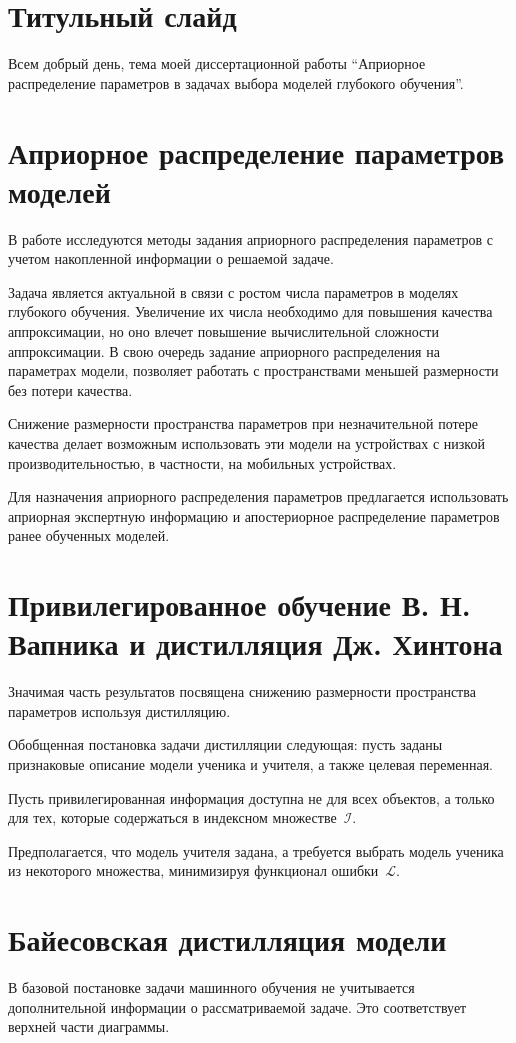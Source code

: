 \documentclass[10pt, twoside]{article}
\begin{document}
\section{Титульный слайд}
Всем добрый день, тема моей диссертационной работы ``Априорное распределение параметров в задачах выбора моделей глубокого обучения''.

\section{Априорное распределение параметров моделей}
В работе исследуются методы задания априорного распределения параметров с учетом накопленной информации о решаемой задаче.

Задача является актуальной в связи с ростом числа параметров в моделях глубокого обучения. Увеличение их числа необходимо для повышения качества аппроксимации, но оно влечет повышение вычислительной сложности аппроксимации. В свою очередь задание априорного распределения на параметрах модели, позволяет работать с пространствами меньшей размерности без потери качества.

Снижение размерности пространства параметров при незначительной потере качества делает возможным использовать эти модели на устройствах с низкой производительностью, в частности, на мобильных устройствах.

Для назначения априорного распределения параметров предлагается использовать априорная экспертную информацию и апостериорное распределение параметров ранее обученных моделей.

\section{Привилегированное обучение В. Н. Вапника и дистилляция Дж. Хинтона}
Значимая часть результатов посвящена снижению размерности пространства параметров используя дистилляцию.

Обобщенная постановка задачи дистилляции следующая: пусть заданы признаковые описание модели ученика и учителя, а также целевая переменная.

Пусть привилегированная информация доступна не для всех объектов, а только для тех, которые содержаться в индексном множестве~$\mathcal{I}$.

Предполагается, что модель учителя задана, а требуется выбрать модель ученика из некоторого множества, минимизируя функционал ошибки~$\mathcal{L}$.

\section{Байесовская дистилляция модели}
В базовой постановке задачи машинного обучения не учитывается дополнительной информации о рассматриваемой задаче. Это соответствует верхней части диаграммы.
\end{document}
